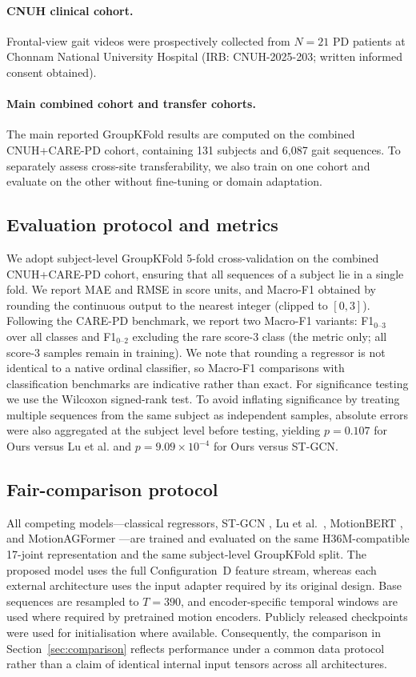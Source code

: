 \documentclass[preprint,12pt]{elsarticle}
\begin{document}
\paragraph{CNUH clinical cohort.}
Frontal-view gait videos were prospectively collected from $N=21$ PD patients
at Chonnam National University Hospital (IRB: CNUH-2025-203; written informed
consent obtained).

\paragraph{Main combined cohort and transfer cohorts.}
The main reported GroupKFold results are computed on the combined
CNUH+CARE-PD cohort, containing 131 subjects and 6{,}087 gait sequences. To
separately assess cross-site transferability, we also train on one cohort and
evaluate on the other without fine-tuning or domain adaptation.

\subsection{Evaluation protocol and metrics}
\label{sec:metrics}
We adopt subject-level GroupKFold 5-fold cross-validation on the combined
CNUH+CARE-PD cohort, ensuring that all sequences of a subject lie in a single
fold. We report MAE and
RMSE in score units, and Macro-F1 obtained by rounding the continuous output to
the nearest integer (clipped to $[0,3]$). Following the CARE-PD benchmark, we
report two Macro-F1 variants: F1$_{0\text{--}3}$ over all classes and
F1$_{0\text{--}2}$ excluding the rare score-3 class (the metric only; all
score-3 samples remain in training). We note that rounding a regressor is not
identical to a native ordinal classifier, so Macro-F1 comparisons with
classification benchmarks are indicative rather than exact. For significance
testing we use the Wilcoxon signed-rank test. To avoid inflating significance by
treating multiple sequences from the same subject as independent samples,
absolute errors were also aggregated at the subject level before testing,
yielding $p=0.107$ for Ours versus Lu et al. and
$p=9.09\times10^{-4}$ for Ours versus ST-GCN.

\subsection{Fair-comparison protocol}
\label{sec:fairness}
All competing models---classical regressors, ST-GCN \cite{yan2018spatial},
Lu et al.\ \cite{lu2020vision}, MotionBERT \cite{zhu2023motionbert}, and
MotionAGFormer \cite{mehraban2024motionagformer}---are trained and evaluated on
the same H36M-compatible 17-joint representation and the same subject-level
GroupKFold split. The proposed model uses the full Configuration~D feature
stream, whereas each external architecture uses the input adapter required by
its original design. Base sequences are resampled to $T=390$, and
encoder-specific temporal windows are used where required by pretrained motion
encoders. Publicly released checkpoints were used for initialisation where
available. Consequently, the comparison in Section~\ref{sec:comparison}
reflects performance under a common data protocol rather than a claim of
identical internal input tensors across all architectures.
\end{document}

